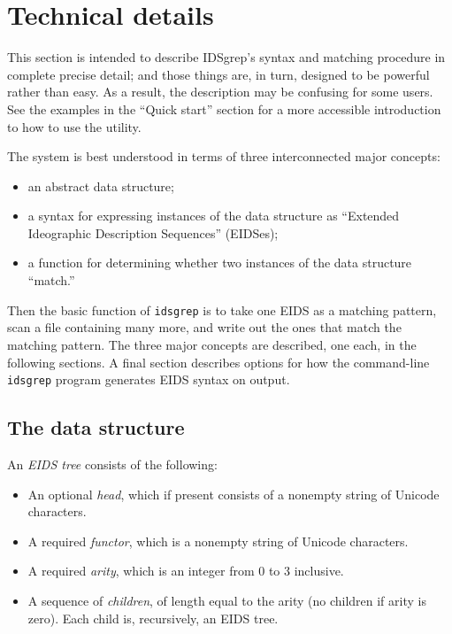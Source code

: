 \documentclass[twocolumn]{report}
\begin{document}

\chapter{Technical details}

\noindent

This section is intended to describe IDSgrep's syntax and matching procedure
in complete precise detail; and those things are, in turn, designed to be
powerful rather than easy.  As a result, the description may be confusing
for some users.  See the examples in the ``Quick start'' section for a more
accessible introduction to how to use the utility.

The system is best understood in terms of three interconnected major
concepts:
\begin{itemize}
  \item an abstract data structure;
  \item a syntax for expressing instances of the data structure as
    ``Extended Ideographic Description Sequences'' (EIDSes);
  \item a function for determining whether two instances of the data
    structure ``match.''
\end{itemize}

Then the basic function of \texttt{idsgrep} is to take one EIDS as a
matching pattern, scan a file containing many more, and write out the ones
that match the matching pattern.  The three major concepts are described,
one each, in the following sections.  A final section describes options for
how the command-line \texttt{idsgrep} program
generates EIDS syntax on output.


\section{The data structure}

An \emph{EIDS tree} consists of the following:

\begin{itemize}
  \item An optional \emph{head}, which if present consists of a nonempty
    string of Unicode characters.
  \item A required \emph{functor}, which is a nonempty string of Unicode
    characters.
  \item A required \emph{arity}, which is an integer from 0 to 3 inclusive.
  \item A sequence of \emph{children}, of length equal to the arity (no
    children if arity is zero).  Each child is, recursively, an EIDS tree.
\end{itemize}
\end{document}
